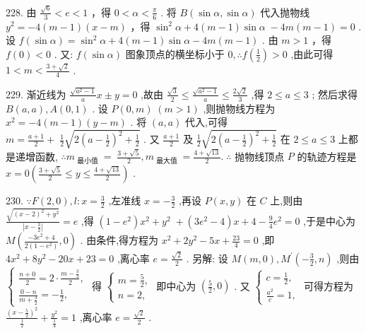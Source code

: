 \documentclass[10pt]{article}
\begin{document}
228. 由 \(\frac{\sqrt{6}}{3} < e < 1\) ，得 \(0 < \alpha  < \frac{\pi }{6}\) . 将 \(B\left( {\sin \alpha ,\sin \alpha }\right)\) 代入抛物线 \({y}^{2} =  - 4\left( {m - 1}\right) \left( {x - m}\right)\) ，得 \({\sin }^{2}\alpha  + 4\left( {m - 1}\right) \sin \alpha \; - {4m}\left( {m - 1}\right)  = 0\) . 设 \(f\left( {\sin \alpha }\right)  = {\sin }^{2}\alpha  + 4\left( {m - 1}\right) \sin \alpha  - {4m}\left( {m - 1}\right)\) . 由 \(m > 1\) ，得 \(f\left( 0\right)  < 0\) . 又: \(f\left( {\sin \alpha }\right)\) 图象顶点的横坐标小于 \(0,\therefore f\left( \frac{1}{2}\right)  > 0\) ,由此可得 \(1 < m < \frac{3 + \sqrt{2}}{4}\) .

229. 渐近线为 \(\frac{\sqrt{{a}^{2} - 1}}{a}x \pm  y = 0\) ,故由 \(\frac{\sqrt{3}}{2} \leq  \frac{\sqrt{{a}^{2} - 1}}{a} \leq  \frac{2\sqrt{2}}{3}\) ,得 \(2 \leq  a \leq  3\) ; 然后求得 \(B\left( {a,a}\right) ,A\left( {0,1}\right)\) . 设 \(P\left( {0,m}\right) \; \left( {m > 1}\right)\) ,则抛物线方程为 \({x}^{2} =  - 4\left( {m - 1}\right) \left( {y - m}\right)\) . 将 \(\left( {a,a}\right)\) 代入,可得 \(m = \frac{a + 1}{2} + \; \frac{1}{2}\sqrt{2{\left( a - \frac{1}{2}\right) }^{2} + \frac{1}{2}}\) . 又 \(\frac{a + 1}{2}\) 及 \(\frac{1}{2}\sqrt{2{\left( a - \frac{1}{2}\right) }^{2} + \frac{1}{2}}\) 在 \(2 \leq  a \leq  3\) 上都是递增函数, \(\therefore {m}_{\text{ 最小值 }} = \; \frac{3 + \sqrt{5}}{2},{m}_{\text{ 最大值 }} = \frac{4 + \sqrt{13}}{2}.\;\therefore\) 抛物线顶点 \(P\) 的轨迹方程是 \(x = 0\left( {\frac{3 + \sqrt{5}}{2} \leq  y \leq  \frac{4 + \sqrt{13}}{2}}\right)\) .

230. \(\because F\left( {2,0}\right) ,l : x = \frac{3}{2}\) ,左准线 \(x =  - \frac{3}{2}\) ,再设 \(P\left( {x,y}\right)\) 在 \(C\) 上,则由 \(\frac{\sqrt{{\left( x - 2\right) }^{2} + {y}^{2}}}{\left| x - \frac{3}{2}\right| } = e\) ,得 \(\left( {1 - {e}^{2}}\right) {x}^{2} + {y}^{2} \; + \left( {3{e}^{2} - 4}\right) x + 4 - \frac{9}{4}{e}^{2} = 0\) ,于是中心为 \(M\left( {\frac{-3{e}^{2} + 4}{2\left( {1 - {e}^{2}}\right) },0}\right)\) . 由条件,得方程为 \({x}^{2} + 2{y}^{2} - {5x} + \frac{23}{4} = 0\) ,即 \(4{x}^{2} + 8{y}^{2} - {20x} + {23} = 0\) ,离心率 \(e = \frac{\sqrt{2}}{2}\) . 另解: 设 \(M\left( {m,0}\right) ,{M}^{\prime }\left( {-\frac{3}{2},n}\right)\) ,则由 \(\left\{  \begin{array}{l} \frac{n + 0}{2} = 2 \cdot  \frac{m - \frac{3}{2}}{2}, \\  \frac{0 - n}{m + \frac{3}{2}} =  - \frac{1}{2}, \end{array}\right.\) 得 \(\left\{  \begin{array}{l} m = \frac{5}{2}, \\  n = 2, \end{array}\right.\) 即中心为 \(\left( {\frac{5}{2},0}\right)\) . 又 \(\left\{  \begin{array}{l} c = \frac{1}{2}, \\  \frac{{a}^{2}}{c} = 1, \end{array}\right.\) 可得方程为 \(\frac{{\left( x - \frac{5}{2}\right) }^{2}}{\frac{1}{2}} + \frac{{y}^{2}}{\frac{1}{4}} = 1\) ,离心率 \(e = \frac{\sqrt{2}}{2}\) .
\end{document}
